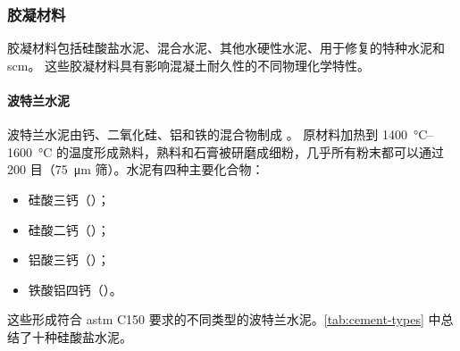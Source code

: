 \subsubsection{胶凝材料}
胶凝材料包括硅酸盐水泥、混合水泥、其他水硬性水泥、用于修复的特种水泥和\acrfull*{scm}。 这些胶凝材料具有影响混凝土耐久性的不同物理化学特性。

\paragraph{波特兰水泥}
波特兰水泥由钙、二氧化硅、铝和铁的混合物制成 \cite{kosmatka2011d}。 原材料加热到 \qtyrange{1400}{1600}{\celsius} 的温度形成熟料，熟料和石膏被研磨成细粉，几乎所有粉末都可以通过 200 目（\qty{75}{\micro m} 筛）。水泥有四种主要化合物：
\begin{itemize}
  \item 硅酸三钙（）；
  \item 硅酸二钙（）；
  \item 铝酸三钙（）；
  \item 铁酸铝四钙（）。
\end{itemize}
这些形成符合 \acrshort*{astm} C150 要求的不同类型的波特兰水泥。\cref{tab:cement-types} 中总结了十种硅酸盐水泥。

